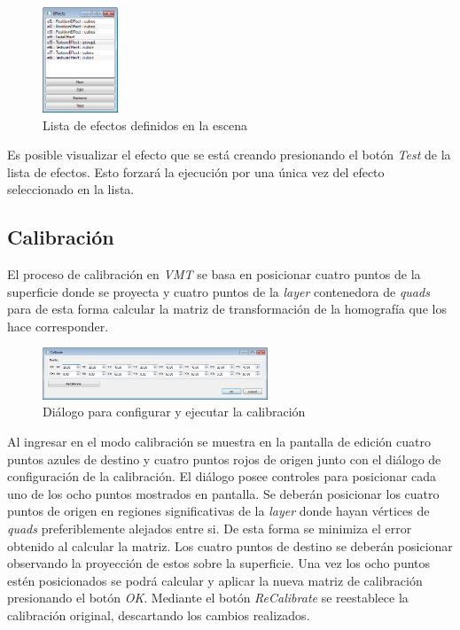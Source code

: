 \begin{figure}[H]
  \centering
    \includegraphics[width=0.2\textwidth]{./Cap5_vmt/vmt_Efects.png}
  \caption{Lista de efectos definidos en la escena}
  \label{fig:VMT-EffectList}
\end{figure}

Es posible visualizar el efecto que se está creando presionando el botón \emph{Test} de la lista de efectos. Esto forzará la ejecución por una única vez del efecto seleccionado en la lista.

\subsection{Calibración}

El proceso de calibración en \emph{VMT} se basa en posicionar cuatro puntos de la superficie donde se proyecta y cuatro puntos de la \emph{layer} contenedora de \emph{quads} para de esta forma calcular la matriz de transformación de la homografía que los hace corresponder.

\begin{figure}[H]
  \centering
    \includegraphics[width=0.6\textwidth]{./Cap5_vmt/vmt_Calibrate.png}
  \caption{Diálogo para configurar y ejecutar la calibración}
  \label{fig:VMT-Calib}
\end{figure}

Al ingresar en el modo calibración se muestra en la pantalla de edición cuatro puntos azules de destino y cuatro puntos rojos de origen junto con el diálogo de configuración de la calibración.
El diálogo posee controles para posicionar cada uno de los ocho puntos mostrados en pantalla. Se deberán posicionar los cuatro puntos de origen en regiones significativas de la \emph{layer} donde hayan vértices de \emph{quads} preferiblemente alejados entre si. De esta forma se minimiza el error obtenido al calcular la matriz.
Los cuatro puntos de destino se deberán posicionar observando la proyección de estos sobre la superficie. Una vez los ocho puntos estén posicionados se podrá calcular y aplicar la nueva matriz de calibración presionando el botón \emph{OK}.
Mediante el botón \emph{ReCalibrate} se reestablece la calibración original, descartando los cambios realizados.

